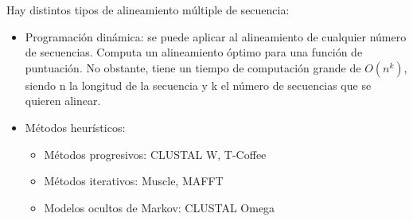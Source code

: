 Hay distintos tipos de alineamiento múltiple de secuencia:
\begin{itemize}
\item Programación dinámica: se puede aplicar al alineamiento de cualquier número de secuencias. Computa un alineamiento óptimo para una función de puntuación. No obstante, tiene un tiempo de computación grande de $O(n^k)$, siendo n la longitud de la secuencia y k el número de secuencias que se quieren alinear.
\item Métodos heurísticos:
\begin{itemize}
\item Métodos progresivos: CLUSTAL W, T-Coffee
\item Métodos iterativos: Muscle, MAFFT
\item Modelos ocultos de Markov: CLUSTAL Omega
\end{itemize}
\end{itemize}